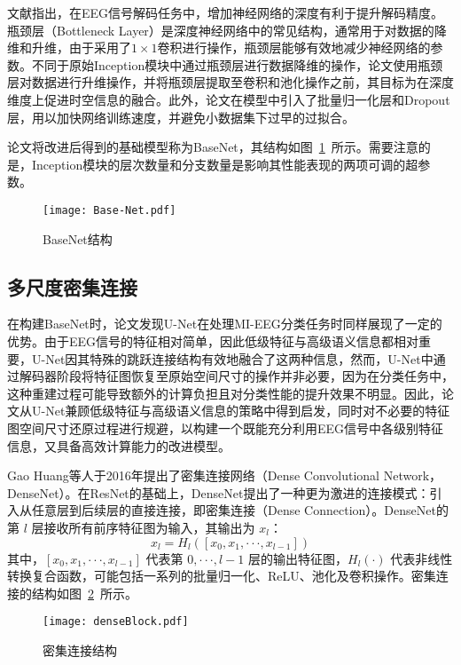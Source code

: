 文献\cite{schirrmeister2017deep,lawhern2018eegnet}指出，在EEG信号解码任务中，增加神经网络的深度有利于提升解码精度。瓶颈层（Bottleneck Layer）是深度神经网络中的常见结构\cite{he2016deep,huang2017densely}，通常用于对数据的降维和升维，由于采用了\(1\times1\)卷积进行操作，瓶颈层能够有效地减少神经网络的参数。不同于原始Inception模块中通过瓶颈层进行数据降维的操作，论文使用瓶颈层对数据进行升维操作，并将瓶颈层提取至卷积和池化操作之前，其目标为在深度维度上促进时空信息的融合。此外，论文在模型中引入了批量归一化层和Dropout层，用以加快网络训练速度，并避免小数据集下过早的过拟合。

论文将改进后得到的基础模型称为BaseNet，其结构如图~\ref{fig:BaseNet}~所示。需要注意的是，Inception模块的层次数量和分支数量是影响其性能表现的两项可调的超参数。
\begin{figure}
    \centering
    \texttt{[image: Base-Net.pdf]}
    \caption{BaseNet结构}
    \label{fig:BaseNet}
\end{figure}

\subsection{多尺度密集连接}

在构建BaseNet时，论文发现U-Net在处理MI-EEG分类任务时同样展现了一定的优势。由于EEG信号的特征相对简单，因此低级特征与高级语义信息都相对重要，U-Net因其特殊的跳跃连接结构有效地融合了这两种信息，然而，U-Net中通过解码器阶段将特征图恢复至原始空间尺寸的操作并非必要，因为在分类任务中，这种重建过程可能导致额外的计算负担且对分类性能的提升效果不明显。因此，论文从U-Net兼顾低级特征与高级语义信息的策略中得到启发，同时对不必要的特征图空间尺寸还原过程进行规避，以构建一个既能充分利用EEG信号中各级别特征信息，又具备高效计算能力的改进模型。

Gao Huang等人于2016年提出了密集连接网络\cite{huang2017densely}（Dense Convolutional Network，DenseNet）。在ResNet的基础上，DenseNet提出了一种更为激进的连接模式：引入从任意层到后续层的直接连接，即密集连接（Dense Connection）。DenseNet的第 \(l\) 层接收所有前序特征图为输入，其输出为 \(x_l\)：
\begin{equation}
  x_l = H_l([x_0, x_1, ···, x_{l-1}])
  \label{eq:dense-conn}
\end{equation}
其中，\([x_0, x_1, ···, x_{l-1}]\) 代表第 \(0, ···, l-1\) 层的输出特征图，\(H_l(·)\) 代表非线性转换复合函数，可能包括一系列的批量归一化、ReLU、池化及卷积操作。密集连接的结构如图~\ref{fig:denseBlock}~所示。
\begin{figure}
  \centering
  \texttt{[image: denseBlock.pdf]}
  \caption{密集连接结构\cite{huang2017densely}}
  \label{fig:denseBlock}
\end{figure}

